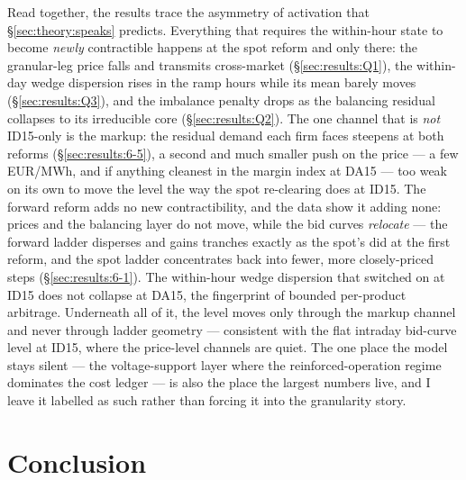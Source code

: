 \documentclass[11pt,a4paper]{article}
\theoremstyle{definition}
\theoremstyle{remark}
\theoremstyle{plain}
\begin{document}
\vspace{10pt}
\noindent Read together, the results trace the asymmetry of activation that \S\ref{sec:theory:speaks} predicts. Everything that requires the within-hour state to become \emph{newly} contractible happens at the spot reform and only there: the granular-leg price falls and transmits cross-market (\S\ref{sec:results:Q1}), the within-day wedge dispersion rises in the ramp hours while its mean barely moves (\S\ref{sec:results:Q3}), and the imbalance penalty drops as the balancing residual collapses to its irreducible core (\S\ref{sec:results:Q2}). The one channel that is \emph{not} ID15-only is the markup: the residual demand each firm faces steepens at both reforms (\S\ref{sec:results:6-5}), a second and much smaller push on the price --- a few EUR/MWh, and if anything cleanest in the margin index at DA15 --- too weak on its own to move the level the way the spot re-clearing does at ID15. The forward reform adds no new contractibility, and the data show it adding none: prices and the balancing layer do not move, while the bid curves \emph{relocate} --- the forward ladder disperses and gains tranches exactly as the spot's did at the first reform, and the spot ladder concentrates back into fewer, more closely-priced steps (\S\ref{sec:results:6-1}). The within-hour wedge dispersion that switched on at ID15 does not collapse at DA15, the fingerprint of bounded per-product arbitrage. Underneath all of it, the level moves only through the markup channel and never through ladder geometry --- consistent with the flat intraday bid-curve level at ID15, where the price-level channels are quiet. The one place the model stays silent --- the voltage-support layer where the reinforced-operation regime dominates the cost ledger --- is also the place the largest numbers live, and I leave it labelled as such rather than forcing it into the granularity story.



\section{Conclusion}\label{sec:conclusion}
\end{document}
